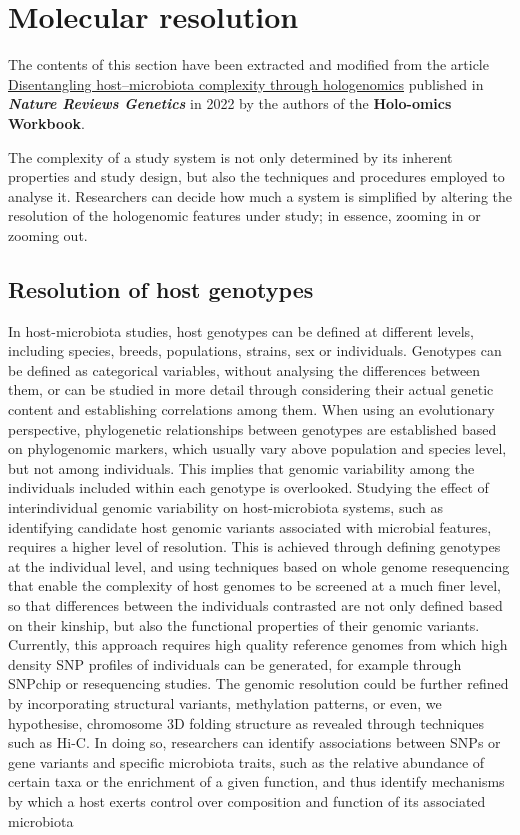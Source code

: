 \documentclass[
]{book}
\begin{document}
\hypertarget{molecular-resolution}{%
\section{Molecular resolution}\label{molecular-resolution}}

The contents of this section have been extracted and modified from the article \href{https://www.nature.com/articles/s41576-021-00421-0}{Disentangling host--microbiota complexity through hologenomics} published in \textbf{\emph{Nature Reviews Genetics}} in 2022 by the authors of the \textbf{Holo-omics Workbook}.

The complexity of a study system is not only determined by its inherent properties and study design, but also the techniques and procedures employed to analyse it. Researchers can decide how much a system is simplified by altering the resolution of the hologenomic features under study; in essence, zooming in or zooming out.

\hypertarget{host-genotype-resolution}{%
\subsection{Resolution of host genotypes}\label{host-genotype-resolution}}

In host-microbiota studies, host genotypes can be defined at different levels, including species, breeds, populations, strains, sex or individuals. Genotypes can be defined as categorical variables, without analysing the differences between them, or can be studied in more detail through considering their actual genetic content and establishing correlations among them. When using an evolutionary perspective, phylogenetic relationships between genotypes are established based on phylogenomic markers, which usually vary above population and species level, but not among individuals. This implies that genomic variability among the individuals included within each genotype is overlooked. Studying the effect of interindividual genomic variability on host-microbiota systems, such as identifying candidate host genomic variants associated with microbial features, requires a higher level of resolution. This is achieved through defining genotypes at the individual level, and using techniques based on whole genome resequencing that enable the complexity of host genomes to be screened at a much finer level, so that differences between the individuals contrasted are not only defined based on their kinship, but also the functional properties of their genomic variants. Currently, this approach requires high quality reference genomes from which high density SNP profiles of individuals can be generated, for example through SNPchip or resequencing studies. The genomic resolution could be further refined by incorporating structural variants, methylation patterns, or even, we hypothesise, chromosome 3D folding structure as revealed through techniques such as Hi-C. In doing so, researchers can identify associations between SNPs or gene variants and specific microbiota traits, such as the relative abundance of certain taxa or the enrichment of a given function, and thus identify mechanisms by which a host exerts control over composition and function of its associated microbiota
\end{document}

